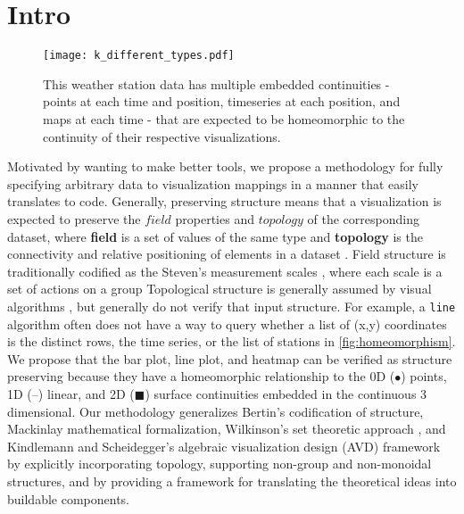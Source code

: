 \documentclass[11pt,titlepage]{amsart}
\begin{document}
\section{Intro}
\label{sec:intro}

\begin{wrapfigure}{r}{3.5in}
\begin{center}
    \texttt{[image: k\_different\_types.pdf]}
\end{center}
\caption{This weather station data has multiple embedded continuities - points at each time and position, timeseries at each position, and maps at each time - that are expected to be homeomorphic to the continuity of their respective visualizations.}
    \label{fig:homeomorphism}
\end{wrapfigure}
Motivated by wanting to make better tools, we propose a methodology for fully specifying arbitrary data to visualization mappings in a manner that easily translates to code. Generally, preserving structure means that a visualization is expected to preserve the $field$ properties and $topology$ of the corresponding dataset, where \textcolor{fiber}{\textbf{field}} is a set of values of the same type and \textcolor{base}{\textbf{topology}} is the connectivity and relative positioning of elements in a dataset \cite{wilkinsonGrammarGraphics2005}.  Field structure is traditionally codified as the Steven's measurement scales \cite{stevensTheoryScalesMeasurement1946}, where each scale is a set of actions on a group Topological structure is generally assumed by visual algorithms \cite{chiTaxonomyVisualizationTechniques2000, toryRethinkingVisualizationHighlevel2004}, but generally do not verify that input structure.
For example, a \texttt{line} algorithm often does not have a way to query whether a list of (x,y) coordinates is the distinct rows, the time series, or the list of stations in \autoref{fig:homeomorphism}. We propose that the bar plot, line plot, and heatmap can be verified as structure preserving because they have a homeomorphic relationship to the 0D ($\bullet$) points, 1D (--) linear, and 2D ($\blacksquare$) surface continuities embedded in the continuous 3 dimensional. Our methodology generalizes Bertin\cite{bertinSemiologyGraphicsDiagrams2011}'s codification of structure,  Mackinlay\cite{mackinlayAutomaticDesignGraphical1987} mathematical formalization, Wilkinson's set theoretic approach \cite{wilkinsonGrammarGraphics2005}, and Kindlemann and Scheidegger's algebraic visualization design (AVD) framework \cite{kindlmannAlgebraicProcessVisualization2014} by explicitly incorporating topology, supporting non-group and non-monoidal structures, and by providing a framework for translating the theoretical ideas into buildable components.
\end{document}
